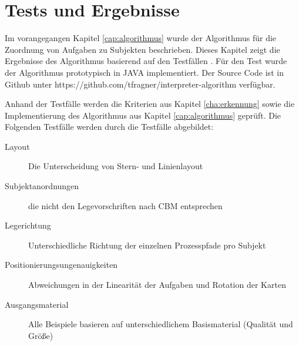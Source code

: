%
%
% 
% 
% 


\chapter{Tests und Ergebnisse}
\label{chap:Ergebnisse}
Im vorangegangen Kapitel \ref{cap:algorithmus} wurde der Algorithmus für die Zuordnung von Aufgaben zu Subjekten beschrieben. Dieses Kapitel zeigt die Ergebnisse des Algorithmus basierend auf den Testfällen \cite{max}. Für den Test wurde der Algorithmus prototypisch in JAVA implementiert. Der Source Code ist in Github unter https://github.com/tfragner/interpreter-algorithm verfügbar.

Anhand der Testfälle werden die Kriterien aus Kapitel \ref{cha:erkennung} sowie die Implementierung des Algorithmus aus Kapitel \ref{cap:algorithmus} geprüft. Die Folgenden Testfälle werden durch die Testfälle abgebildet: 
\begin{description}
	\item[Layout] Die Unterscheidung von Stern- und Linienlayout
	\item[Subjektanordnungen] die nicht den Legevorschriften nach CBM entsprechen
	\item[Legerichtung] Unterschiedliche Richtung der einzelnen Prozesspfade pro Subjekt
	\item[Positionierungsungenauigkeiten] Abweichungen in der Linearität der Aufgaben und Rotation der Karten
	\item[Ausgangsmaterial] Alle Beispiele basieren auf unterschiedlichem Basismaterial (Qualität und Größe)
\end{description}
\newpage
